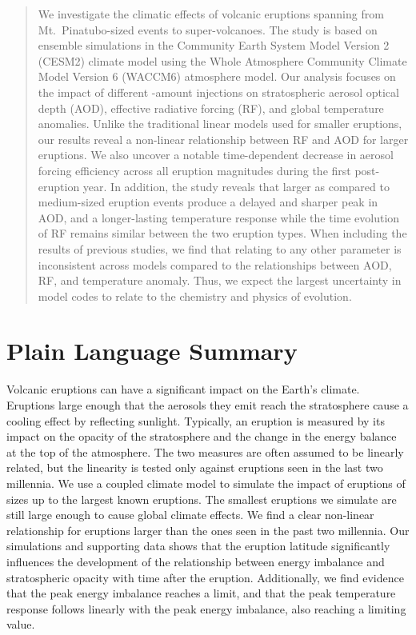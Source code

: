 \documentclass[draft]{agujournal2019}
\begin{document}
\begin{abstract}
  We investigate the climatic effects of volcanic eruptions spanning from Mt.\
  Pinatubo-sized events to super-volcanoes. The study is based on ensemble simulations
  in the Community Earth System Model Version 2 (CESM2) climate model using the Whole
  Atmosphere Community Climate Model Version 6 (WACCM6) atmosphere model. Our analysis
  focuses on the impact of different \ce{SO2}-amount injections on stratospheric aerosol
  optical depth (AOD), effective radiative forcing (RF), and global temperature
  anomalies. Unlike the traditional linear models used for smaller eruptions, our
  results reveal a non-linear relationship between RF and AOD for larger eruptions. We
  also uncover a notable time-dependent decrease in aerosol forcing efficiency across
  all eruption magnitudes during the first post-eruption year. In addition, the study
  reveals that larger as compared to medium-sized eruption events produce a delayed and
  sharper peak in AOD, and a longer-lasting temperature response while the time
  evolution of RF remains similar between the two eruption types. When including the
  results of previous studies, we find that relating \ce{SO2} to any other parameter is
  inconsistent across models compared to the relationships between AOD, RF, and
  temperature anomaly. Thus, we expect the largest uncertainty in model codes to relate
  to the chemistry and physics of \ce{SO2} evolution.
\end{abstract}

\section*{Plain Language Summary}


Volcanic eruptions can have a significant impact on the Earth's climate. Eruptions large
enough that the aerosols they emit reach the stratosphere cause a cooling effect by
reflecting sunlight. Typically, an eruption is measured by its impact on the opacity of
the stratosphere and the change in the energy balance at the top of the atmosphere. The
two measures are often assumed to be linearly related, but the linearity is tested
only against eruptions seen in the last two millennia. We use a coupled climate model to
simulate the impact of eruptions of sizes 
up to the largest known eruptions. The smallest eruptions we simulate are still large enough to cause global climate effects. We find a clear non-linear relationship for eruptions larger than the ones seen in the past two
millennia. Our simulations and supporting data shows that the eruption latitude significantly influences the
development of the relationship between energy imbalance and stratospheric opacity with time after the eruption.
Additionally, we find evidence that the peak energy imbalance reaches a limit, and that
the peak temperature response follows linearly with the peak energy imbalance, also
reaching a limiting value.
\end{document}
